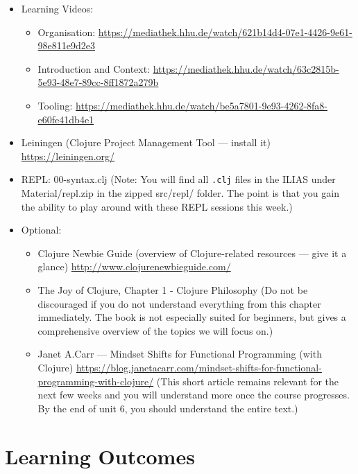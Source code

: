 \documentclass[11pt,a4paper]{article}
\begin{document}
	\begin{itemize}
        \item Learning Videos: 
            \begin{itemize}
                \item Organisation: \url{https://mediathek.hhu.de/watch/621b14d4-07e1-4426-9e61-98e811e9d2e3}
                \item Introduction and Context: \url{https://mediathek.hhu.de/watch/63c2815b-5e93-48e7-89cc-8ff1872a279b}
                \item Tooling: \url{https://mediathek.hhu.de/watch/be5a7801-9e93-4262-8fa8-e60fe41db4e1}
            \end{itemize}
        \item Leiningen (Clojure Project Management Tool --- install it) \url{https://leiningen.org/}
        \item REPL: 00-syntax.clj (Note: You will find all \verb|.clj| files in the ILIAS under Material/repl.zip in the zipped src/repl/ folder. The point is that you gain the ability to play around with these REPL sessions this week.)
        \item Optional:
            \begin{itemize}
                \item Clojure Newbie Guide (overview of Clojure-related resources --- give it a glance) \url{http://www.clojurenewbieguide.com/}
                \item The Joy of Clojure, Chapter 1 - Clojure Philosophy 
                    (Do not be discouraged if you do not understand everything from this chapter immediately.
                    The book is not especially suited for beginners, but gives a comprehensive overview of the topics we will focus on.)
                \item Janet A.\@ Carr --- Mindset Shifts for Functional Programming (with Clojure) \url{https://blog.janetacarr.com/mindset-shifts-for-functional-programming-with-clojure/}
                    (This short article remains relevant for the next few weeks and you will understand more once the course progresses. By the end of unit 6, you should understand the entire text.)
            \end{itemize}
	\end{itemize}
	
	
	\section{Learning Outcomes}
	
\end{document}
